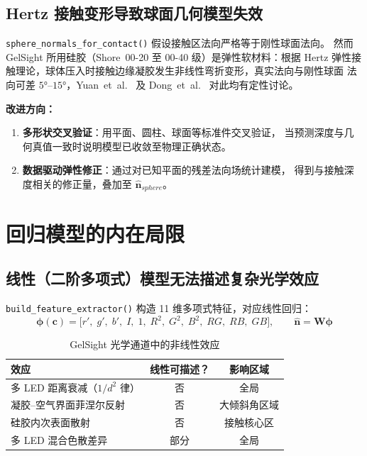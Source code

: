 \subsection{Hertz 接触变形导致球面几何模型失效}
\label{subsec:hertz}

\texttt{sphere\_normals\_for\_contact()} 假设接触区法向严格等于刚性球面法向。
然而 GelSight 所用硅胶（Shore~00-20 至 00-40 级）是弹性软材料：根据 Hertz
弹性接触理论，球体压入时接触边缘凝胶发生非线性弯折变形，真实法向与刚性球面
法向可差 $5°$--$15°$，Yuan~et~al.~\cite{yuan2017gelsight} 及
Dong~et~al.~\cite{dong2017improved} 对此均有定性讨论。

\textbf{改进方向：}
\begin{enumerate}
  \item \textbf{多形状交叉验证}：用平面、圆柱、球面等标准件交叉验证，
        当预测深度与几何真值一致时说明模型已收敛至物理正确状态。
  \item \textbf{数据驱动弹性修正}：通过对已知平面的残差法向场统计建模，
        得到与接触深度相关的修正量，叠加至 $\hat{\mathbf{n}}_{sphere}$。
\end{enumerate}

\section{回归模型的内在局限}
\label{sec:regression}

\subsection{线性（二阶多项式）模型无法描述复杂光学效应}
\label{subsec:linear_model}

\texttt{build\_feature\_extractor()} 构造 11 维多项式特征，对应线性回归：
\[
  \boldsymbol{\phi}(\mathbf{c})
  = \bigl[r',\; g',\; b',\; I,\; 1,\; R^2,\; G^2,\; B^2,\; RG,\; RB,\; GB\bigr],
  \qquad
  \hat{\mathbf{n}} = \mathbf{W}\boldsymbol{\phi}
\]

\begin{table}[ht]
  \centering
  \caption{GelSight 光学通道中的非线性效应}
  \label{tab:nonlinear}
  \begin{tabular}{lcc}
    \toprule
    \textbf{效应}                      & \textbf{线性可描述？} & \textbf{影响区域} \\
    \midrule
    多 LED 距离衰减（$1/d^2$ 律）      & 否        & 全局         \\
    凝胶--空气界面菲涅尔反射            & 否        & 大倾斜角区域 \\
    硅胶内次表面散射                    & 否        & 接触核心区   \\
    多 LED 混合色散差异                 & 部分      & 全局         \\
    \bottomrule
  \end{tabular}
\end{table}

